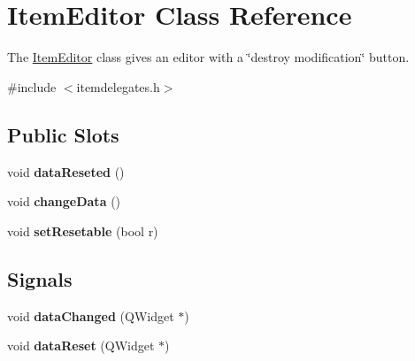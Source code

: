 \hypertarget{class_item_editor}{\section{\-Item\-Editor \-Class \-Reference}
\label{class_item_editor}
}


\-The \hyperlink{class_item_editor}{\-Item\-Editor} class gives an editor with a \char`\"{}destroy modification\char`\"{} button.  




{\ttfamily \#include $<$itemdelegates.\-h$>$}

\subsection*{\-Public \-Slots}
\begin{DoxyCompactItemize}
\item 
\hypertarget{class_item_editor_abc8de9a31edf1fa50d486e6e31b2ee78}{void {\bfseries data\-Reseted} ()}\label{class_item_editor_abc8de9a31edf1fa50d486e6e31b2ee78}

\item 
\hypertarget{class_item_editor_add462bed1b1bf732ebe2a1272eea8e4c}{void {\bfseries change\-Data} ()}\label{class_item_editor_add462bed1b1bf732ebe2a1272eea8e4c}

\item 
\hypertarget{class_item_editor_a06a93eb64399ff486cb1372cbc8e566d}{void {\bfseries set\-Resetable} (bool r)}\label{class_item_editor_a06a93eb64399ff486cb1372cbc8e566d}

\end{DoxyCompactItemize}
\subsection*{\-Signals}
\begin{DoxyCompactItemize}
\item 
\hypertarget{class_item_editor_a7a3699c869b93d0a412a01fa116cf9c0}{void {\bfseries data\-Changed} (\-Q\-Widget $\ast$)}\label{class_item_editor_a7a3699c869b93d0a412a01fa116cf9c0}

\item 
\hypertarget{class_item_editor_a8d55b2a3b8df5b90e2bc8f1888ac7e7a}{void {\bfseries data\-Reset} (\-Q\-Widget $\ast$)}\label{class_item_editor_a8d55b2a3b8df5b90e2bc8f1888ac7e7a}

\end{DoxyCompactItemize}
